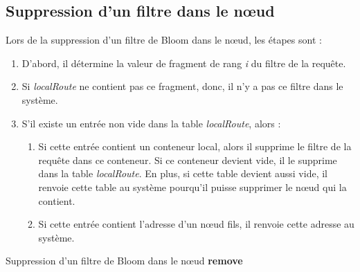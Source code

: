 \documentclass[a4paper,11pt]{report}
\begin{document}
\subsection{Suppression d'un filtre dans le nœud}
	Lors de la suppression d'un filtre de Bloom dans le nœud, les étapes sont : 
	\begin{enumerate}
		\item D'abord, il détermine la valeur de fragment de rang \textit{i} du filtre de la requête.
		\item Si \textit{localRoute} ne contient pas ce fragment, donc, il n'y a pas ce filtre dans le système.
		\item S'il existe un entrée non vide dans la table \textit{localRoute}, alors : 
		\begin{enumerate}
			\item Si cette entrée contient un conteneur local, alors il supprime le filtre de la requête dans ce conteneur. Si ce conteneur devient vide, il le supprime dans la table \textit{localRoute}. En plus, si cette table devient aussi vide, il renvoie cette table au système pourqu'il puisse supprimer le nœud qui la contient.
			\item Si cette entrée contient l'adresse d'un nœud fils, il renvoie cette adresse au système.
		\end{enumerate}
	\end{enumerate}

\newpage
\begin{algorithme}
	Suppression d'un filtre de Bloom dans le nœud \textbf{remove}
\end{algorithme}
\end{document}
